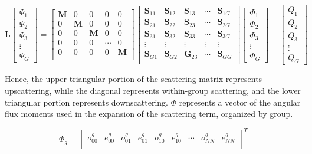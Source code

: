 \documentclass[10pt]{article}
\begin{document}
\begin{flushleft}
\begin{equation}
\textbf{L}\begin{bmatrix}\Psi_1\\\Psi_2\\\Psi_3\\\vdots\\\Psi_G\end{bmatrix}=
\begin{bmatrix}
\textbf{M} & 0 & 0 & 0 & 0\\
0 & \textbf{M} & 0 & 0 & 0\\
0 & 0 & \textbf{M} & 0 & 0\\
0 & 0 & 0 & \cdots & 0\\
0 & 0 & 0 & 0 & \textbf{M}\\
\end{bmatrix}
\begin{bmatrix}
\textbf{S}_{11} & \textbf{S}_{12} & \textbf{S}_{13} & \cdots & \textbf{S}_{1G}\\
\textbf{S}_{21} & \textbf{S}_{22} & \textbf{S}_{23} & \cdots & \textbf{S}_{2G}\\
\textbf{S}_{31} & \textbf{S}_{32} & \textbf{S}_{33} & \cdots & \textbf{S}_{3G}\\
\vdots & \vdots & \vdots & \vdots & \vdots\\
\textbf{S}_{G1} & \textbf{S}_{G2} & \textbf{G}_{23} & \cdots & \textbf{S}_{GG}\\
\end{bmatrix}
\begin{bmatrix}
\Phi_1\\\Phi_2\\\Phi_3\\\vdots\\\Phi_G
\end{bmatrix}
+
\begin{bmatrix}
Q_1\\Q_2\\Q_3\\\vdots\\Q_G
\end{bmatrix}
\end{equation}

Hence, the upper triangular portion of the scattering matrix represents upscattering, while the diagonal represents within-group scattering, and the lower triangular portion represents downscattering. \(\Phi\) represents a vector of the angular flux moments used in the expansion of the scattering term, organized by group. 

\begin{equation}
\Phi_g=\begin{bmatrix}
o_{00}^g & e_{00}^g & o_{01}^g & e_{01}^g & o_{10}^g & e_{10}^g & \cdots & o_{NN}^g & e_{NN}^g\\
\end{bmatrix}^T
\end{equation}


\end{flushleft}
\end{document}
